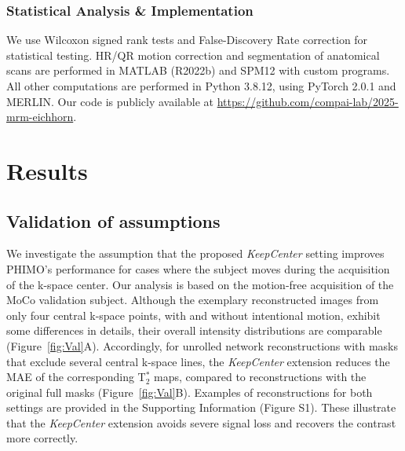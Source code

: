 \documentclass[AMA,STIX2COL]{MRM}
\newcommand{\tstar}[1]{{T$_2^*$}}
\begin{document}
\subsubsection{Statistical Analysis \& Implementation}  \label{sec:methods:stat_anal}
We use Wilcoxon signed rank tests and False-Discovery Rate correction for statistical testing. 
HR/QR motion correction and segmentation of anatomical scans are performed in MATLAB (R2022b) and SPM12 with custom programs.\cite{Kaczmarz_2020b} All other computations are performed in Python 3.8.12, using PyTorch 2.0.1 and MERLIN.\cite{HammernikKuestner2022} Our code is publicly available at \url{https://github.com/compai-lab/2025-mrm-eichhorn}.


\section{Results} \label{sec:results}
\subsection{Validation of assumptions} \label{sec:results:val}
We investigate the assumption that the proposed \textit{KeepCenter} setting improves PHIMO's performance for cases where the subject moves during the acquisition of the k-space center. Our analysis is based on the motion-free acquisition of the MoCo validation subject.
Although the exemplary reconstructed images from only four central k-space points, with and without intentional motion, exhibit some differences in details, their overall intensity distributions are comparable (Figure~\ref{fig:Val}A). 
Accordingly, for unrolled network reconstructions with masks that exclude several central k-space lines, the \textit{KeepCenter} extension reduces the MAE of the corresponding \tstar{} maps, compared to reconstructions with the original full masks (Figure~\ref{fig:Val}B). 
Examples of reconstructions for both settings are provided in the Supporting Information (Figure S1). These illustrate that the \textit{KeepCenter} extension avoids severe signal loss and recovers the contrast more correctly. 
\end{document}
